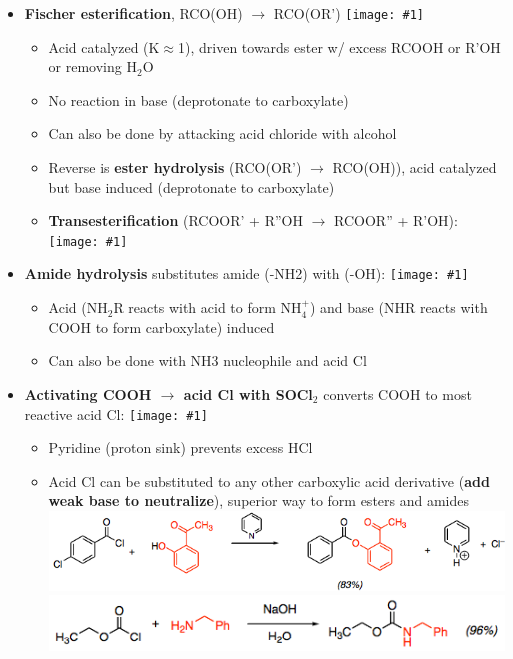 \documentclass[10pt,landscape]{article}
\newcommand{\img}[1]{\texttt{[image: \#1]}}
\begin{document}
\begin{multicols*}{3}
\begin{scriptsize}
    \begin{itemize}
    \item \textbf{Fischer esterification}, RCO(OH) $\rightarrow$ RCO(OR') 
      \img{fischer.png}
      \begin{itemize}
      \item Acid catalyzed (K$\approx$1), driven towards ester w/ excess RCOOH or R'OH or
        removing H$_2$O
      \item No reaction in base (deprotonate to carboxylate)
      \item Can also be done by attacking acid chloride with alcohol
      \item Reverse is \textbf{ester hydrolysis} (RCO(OR') $\rightarrow$ RCO(OH)), acid catalyzed but
        base induced (deprotonate to carboxylate)
      \item \textbf{Transesterification} (RCOOR' + R''OH $\rightarrow$ RCOOR'' + R'OH):
        \img{transester.png}
      \end{itemize}
    \item \textbf{Amide hydrolysis} substitutes amide (-NH2) with (-OH):
      \img{amidehydr.png}
      \begin{itemize}
      \item Acid (NH$_2$R reacts with acid to form NH$_4^+$) and base (NHR reacts with COOH to form
        carboxylate) induced
      \item Can also be done with NH3 nucleophile and acid Cl
      \end{itemize}
    \item \textbf{Activating COOH $\rightarrow$ acid Cl with SOCl$_2$} converts COOH to most
      reactive acid Cl:
      \img{acidcl.png}
      \begin{itemize}
      \item Pyridine (proton sink) prevents excess HCl
      \item Acid Cl can be substituted to any other carboxylic acid derivative (\textbf{add weak
          base to neutralize}), superior way to form esters and amides
        \includegraphics[scale=0.33]{esterfromcocl.png}\\
        \includegraphics[scale=0.33]{amidefromcocl.png}

\end{itemize}
\end{itemize}
\end{scriptsize}
\end{multicols*}
\end{document}
